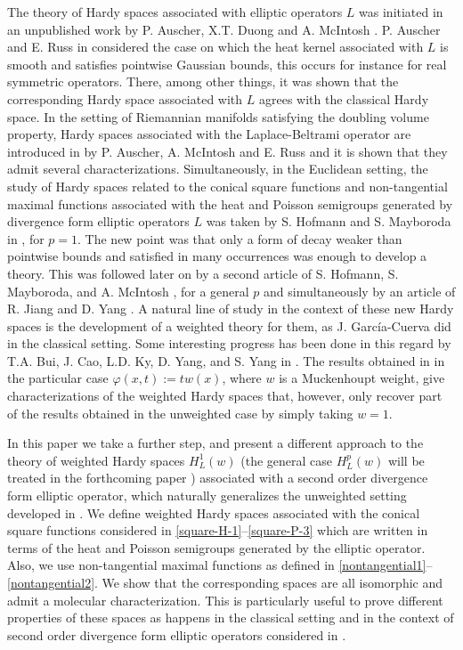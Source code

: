 \documentclass[11pt, a4paper,leqno]{amsart}
\theoremstyle{plain}
\theoremstyle{definition}
\theoremstyle{remark}
\numberwithin{equation}{section}
\begin{document}
The theory of Hardy spaces associated with elliptic operators $L$ was initiated in an unpublished work by P. Auscher, X.T. Duong and A. McIntosh \cite{Auscher-Duong-McIntosh}. P. Auscher and E. Russ in \cite{Auscher-Russ} considered the case on which the heat kernel associated with $L$ is smooth and satisfies pointwise Gaussian bounds, this occurs for instance for real symmetric  operators.  There, among other things, it was shown that the corresponding  Hardy space associated with $L$ agrees with the classical Hardy space.
In the setting of Riemannian manifolds satisfying the doubling volume property,
Hardy spaces associated with the Laplace-Beltrami operator are introduced in
\cite{Auscher-McIntosh-Russ} by P. Auscher, A. McIntosh and E. Russ and it is
shown that they admit several characterizations.  Simultaneously, in the
Euclidean setting, the study of  Hardy spaces related to the conical square
functions and non-tangential maximal functions associated with the heat and
Poisson  semigroups generated by divergence form elliptic operators $L$ was
taken by S. Hofmann and S. Mayboroda in \cite{HofmannMayboroda}, for $p=1$. The
new point was that only a form of decay weaker than pointwise bounds
and satisfied in many occurrences was enough to develop a theory. This was
followed later on by a second article of S. Hofmann, S. Mayboroda,
and A. McIntosh  \cite{HofmannMayborodaMcIntosh}, for a general $p$ and
simultaneously by an article of R. Jiang and D. Yang \cite{JiangYang}.
 A natural line of study in the context of these new Hardy spaces is the development of a weighted theory for them, as J. Garc\'ia-Cuerva did in the classical setting. Some interesting progress has been done in this regard by T.A. Bui, J. Cao, L.D. Ky, D. Yang, and S. Yang in \cite{BuiCaoKyYangYang,  BuiCaoKyYangYang:II}. The results obtained in \cite{BuiCaoKyYangYang:II} 
in the particular case $\varphi(x,t):=tw(x)$,  where $w$ is a Muckenhoupt weight, give characterizations of the weighted Hardy spaces that, however, only recover part of the results obtained in the unweighted case by simply taking $w=1$.  

In this paper we take a further step, and present a different approach to the theory of weighted Hardy spaces $H^1_L(w)$ (the general case $H^p_L(w)$ will be treated in the forthcoming paper \cite{Prisuelos}) associated with a second order divergence form elliptic operator, which naturally generalizes the unweighted setting developed in \cite{HofmannMayboroda}. We define weighted Hardy spaces associated with the conical square functions considered in \eqref{square-H-1}--\eqref{square-P-3} which are written in terms of the heat and Poisson semigroups generated by the elliptic operator. Also, we use  non-tangential maximal functions as defined in \eqref{nontangential1}--\eqref{nontangential2}. We show that the corresponding spaces are all isomorphic and admit a molecular characterization. This is particularly useful to prove different properties of these spaces as happens in the classical setting and in the context of second order divergence form elliptic operators considered in \cite{HofmannMayboroda}. 
\end{document}
